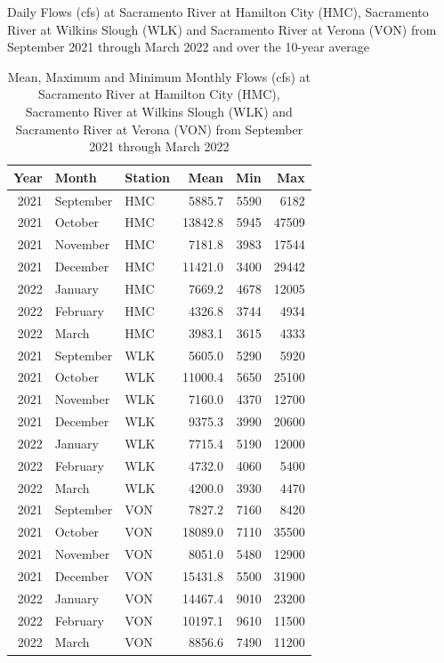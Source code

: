 \documentclass[
]{book}
\theoremstyle{definition}
\theoremstyle{definition}
\theoremstyle{definition}
\theoremstyle{definition}
\theoremstyle{remark}
\begin{document}
\label{fig:HMCWLKVONflow-fig}Daily Flows (cfs) at Sacramento River at Hamilton City (HMC), Sacramento River at Wilkins Slough (WLK) and Sacramento River at Verona (VON) from September 2021 through March 2022 and over the 10-year average

\begin{table}
\centering
\caption{Mean, Maximum and Minimum Monthly Flows (cfs) at Sacramento River at Hamilton City (HMC), Sacramento River at Wilkins Slough (WLK) and Sacramento River at Verona (VON) from September 2021  through March 2022}
\centering
\begin{tabular}[t]{rllrrr}
\hline
Year & Month & Station & Mean & Min & Max\\
\hline
2021 & September & HMC & 5885.7 & 5590 & 6182\\
\hline
2021 & October & HMC & 13842.8 & 5945 & 47509\\
\hline
2021 & November & HMC & 7181.8 & 3983 & 17544\\
\hline
2021 & December & HMC & 11421.0 & 3400 & 29442\\
\hline
2022 & January & HMC & 7669.2 & 4678 & 12005\\
\hline
2022 & February & HMC & 4326.8 & 3744 & 4934\\
\hline
2022 & March & HMC & 3983.1 & 3615 & 4333\\
\hline
2021 & September & WLK & 5605.0 & 5290 & 5920\\
\hline
2021 & October & WLK & 11000.4 & 5650 & 25100\\
\hline
2021 & November & WLK & 7160.0 & 4370 & 12700\\
\hline
2021 & December & WLK & 9375.3 & 3990 & 20600\\
\hline
2022 & January & WLK & 7715.4 & 5190 & 12000\\
\hline
2022 & February & WLK & 4732.0 & 4060 & 5400\\
\hline
2022 & March & WLK & 4200.0 & 3930 & 4470\\
\hline
2021 & September & VON & 7827.2 & 7160 & 8420\\
\hline
2021 & October & VON & 18089.0 & 7110 & 35500\\
\hline
2021 & November & VON & 8051.0 & 5480 & 12900\\
\hline
2021 & December & VON & 15431.8 & 5500 & 31900\\
\hline
2022 & January & VON & 14467.4 & 9010 & 23200\\
\hline
2022 & February & VON & 10197.1 & 9610 & 11500\\
\hline
2022 & March & VON & 8856.6 & 7490 & 11200\\
\hline
\end{tabular}
\end{table}
\end{document}
